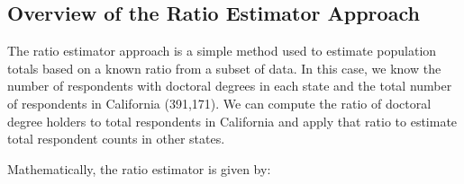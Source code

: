 \documentclass[
  letterpaper,
  DIV=11,
  numbers=noendperiod]{scrartcl}
\begin{document}
\subsection{Overview of the Ratio Estimator
Approach}\label{overview-of-the-ratio-estimator-approach}

The ratio estimator approach is a simple method used to estimate
population totals based on a known ratio from a subset of data. In this
case, we know the number of respondents with doctoral degrees in each
state and the total number of respondents in California (391,171). We
can compute the ratio of doctoral degree holders to total respondents in
California and apply that ratio to estimate total respondent counts in
other states.

Mathematically, the ratio estimator is given by:
\end{document}
